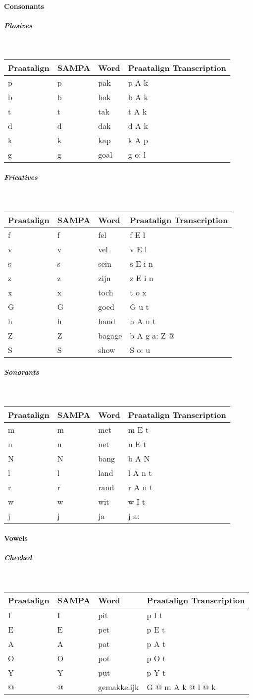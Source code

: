 \paragraph{Consonants}
\subparagraph{Plosives}\strut\\
\begin{tabular}{llll}
	Praatalign & SAMPA & Word & Praatalign Transcription\\
	\hline
		p & p & pak & p A k\\
		b & b & bak & b A k\\
		t & t & tak & t A k\\
		d & d & dak & d A k\\
		k & k & kap & k A p\\
		g & g & goal & g o: l
\end{tabular}

\subparagraph{Fricatives}\strut\\
\begin{tabular}{llll}
	Praatalign & SAMPA & Word & Praatalign Transcription\\
	\hline
	f & f & fel & f E l\\
	v & v & vel & v E l\\
	s & s & sein & s E i n\\
	z & z & zijn & z E i n\\
	x & x & toch & t o x\\
	G & G & goed & G u t\\
	h & h & hand & h A n t\\
	Z & Z & bagage & b A g a: Z @\\
	S & S & show & S o: u
\end{tabular}

\subparagraph{Sonorants}\strut\\
\begin{tabular}{llll}
	Praatalign & SAMPA & Word & Praatalign Transcription\\
	\hline
	m & m & met & m E t\\
	n & n & net & n E t\\
	N & N & bang & b A N\\
	l & l & land & l A n t\\
	r & r & rand & r A n t\\
	w & w & wit & w I t\\
	j & j & ja & j a:
\end{tabular}

\paragraph{Vowels}
\subparagraph{Checked}\strut\\
\begin{tabular}{llll}
	Praatalign & SAMPA & Word & Praatalign Transcription\\
	\hline
	I & I & pit & p I t\\
	E & E & pet & p E t\\
	A & A & pat & p A t\\
	O & O & pot & p O t\\
	Y & Y & put & p Y t\\
	@ & @ & gemakkelijk & G @ m A k @ l @ k
\end{tabular}


